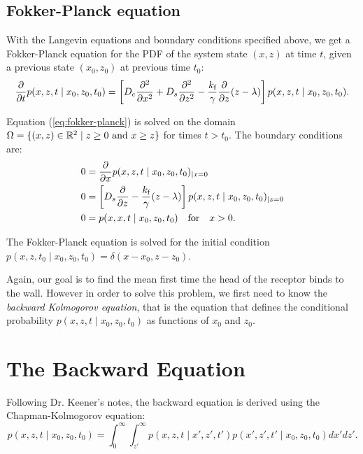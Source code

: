 \documentclass{article}
\newcommand{\tn}{\textnormal}
\newcommand{\stiff}{\frac{k_\tn{f}}{\gamma}}
\newcommand{\dd}{d}
\newcommand{\Pder}[2]{\frac{\partial #1}{\partial #2}}
\newcommand{\Integral}[4]{\int_{#3}^{#4} {#1} \dd #2}
\newcommand{\xdiff}{\frac{\partial^2}{\partial x^2}}
\newcommand{\zdiff}{\frac{\partial^2}{\partial z^2}}
\def\R{\mathbb{R}}
\begin{document}
\subsection{Fokker-Planck equation}

With the Langevin equations and boundary conditions specified above,
we get a Fokker-Planck equation for the PDF of the system state $(x,
z)$ at time $t$, given a previous state $(x_0, z_0)$ at previous time
$t_0$:
\begin{equation}
  \Pder{}{t}p(x, z, t \mid x_0, z_0, t_0) = \left[D_c \xdiff + D_s \zdiff -
    \stiff \Pder{}{z} (z - \lambda)\right] p(x, z, t \mid x_0, z_0, t_0).
  \label{eq:fokker-planck}
\end{equation}

Equation (\ref{eq:fokker-planck}) is solved on the domain $\Omega =
\{(x, z) \in \R^2  \mid  z \ge 0 \tn{ and } x \ge z\}$ for times $t >
t_0$. The boundary conditions are:
\begin{align}
  \label{eq:x-noflux}
  0 &= \Pder{}{x}p(x, z, t \mid x_0, z_0, t_0)_{|x = 0} \\
  \label{eq:z-noflux}
  0 &= \left[D_s \Pder{}{z} - \stiff (z - \lambda)\right]p(x, z,
  t \mid x_0, z_0, t_0) _{|z = 0} \\
  \label{eq:xz-absorb}
  0 &= p(x, x, t \mid x_0, z_0, t_0) \quad \tn{for} \quad x > 0.
\end{align}

The Fokker-Planck equation is solved for the initial condition $p(x,
z, t_0 \mid x_0, z_0, t_0) = \delta(x - x_0, z - z_0)$.

Again, our goal is to find the mean first time the head of the
receptor binds to the wall. However in order to solve this problem, we
first need to know the \emph{backward Kolmogorov equation}, that is
the equation that defines the conditional probability $p(x, z, t \mid x_0,
z_0, t_0)$ as functions of $x_0$ and $z_0$.

\section{The Backward Equation}

Following Dr. Keener's notes, the backward equation is derived using
the Chapman-Kolmogorov equation:
\begin{equation}
  p(x, z, t \mid x_0, z_0, t_0) = \Integral{\Integral{p(x, z, t \mid x', z', t')
      p(x', z', t' \mid x_0, z_0, t_0)}{x'}{z'}{\infty}}{z'}{0}{\infty}.
  \label{eq:chap-kolm}
\end{equation}
\end{document}
